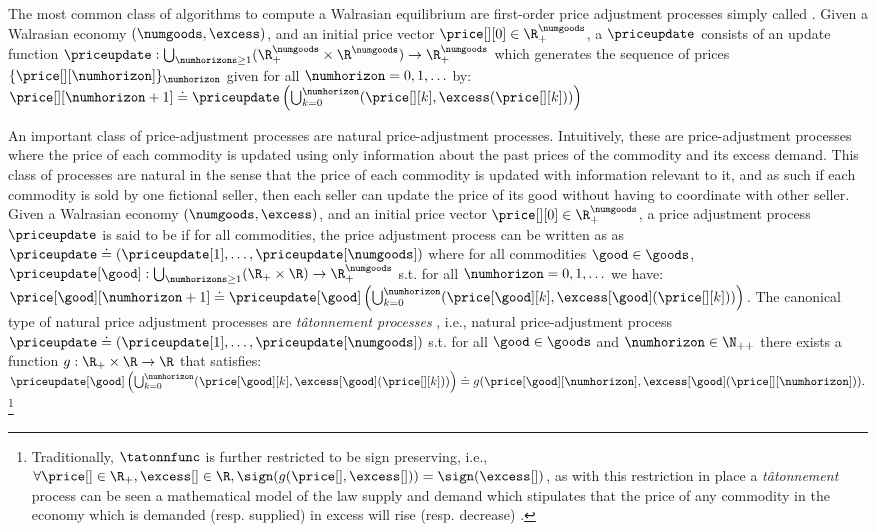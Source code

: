 The most common class of algorithms to compute a Walrasian equilibrium are first-order price adjustment processes simply called  \cite{papadimitriou2010impossibility}.
Given a Walrasian economy $(\numgoods, \excess)$, and an initial price vector $\price[][0] \in \R^\numgoods_+$, a  $\priceupdate$ consists of an update function $\priceupdate: \bigcup_{\numhorizons \geq 1} (\R^\numgoods_+ \times \R^\numgoods) \to \R^\numgoods_+$ which generates the sequence of prices $\{\price[][\numhorizon]\}_{\numhorizon}$ given for all $\numhorizon = 0, 1, \hdots$ by:
$
    \price[][\numhorizon + 1] \doteq  \priceupdate\left(\bigcup_{k = 0}^{\numhorizon} (\price[][k], \excess(\price[][k])) \right)
$

An important class of price-adjustment processes are natural price-adjustment processes. Intuitively, these are price-adjustment processes where the price of each commodity is updated using only information about the past prices of the commodity and its excess demand. This class of processes are natural in the sense that the price of each commodity is updated with information relevant to it, and as such if each commodity is sold by one fictional seller, then each seller can update the price of its good without having to coordinate with other seller.
Given a Walrasian economy $(\numgoods, \excess)$, and an initial price vector $\price[][0] \in \R^\numgoods_+$, a price adjustment process $\priceupdate$ is said to be  if for all commodities, the price adjustment process can be written as as $\priceupdate \doteq (\priceupdate[1], \hdots, \priceupdate[\numgoods])$ where for all commodities $\good \in \goods$, $\priceupdate[\good]: \bigcup_{\numhorizons \geq 1} (\R_+ \times \R) \to \R^\numgoods_+$ s.t. for all $\numhorizon = 0, 1, \hdots$ we have:
$
        \price[\good][\numhorizon + 1] \doteq  \priceupdate[\good]\left(\bigcup_{k = 0}^{\numhorizon} (\price[\good][k], \excess[\good](\price[][k])) \right)
$.
The canonical type of natural price adjustment processes are \emph{t\^atonnement processes} \cite{walras, arrow-hurwicz}, i.e., natural price-adjustment process $\priceupdate \doteq (\priceupdate[1], \hdots, \priceupdate[\numgoods])$ s.t. for all $\good \in \goods$ and $\numhorizon \in \N_{++}$ there exists a function $g: \R_+ \times \R \to \R$ that satisfies:
$\priceupdate[\good]\left(\bigcup_{k = 0}^{\numhorizon} (\price[\good][k], \excess[\good](\price[][k])) \right) \doteq g(\price[\good][\numhorizon], \excess[\good](\price[][\numhorizon])).
$%
\footnote{
Traditionally, $\tatonnfunc$ is further restricted to be sign preserving, i.e.,  $\forall \price[ ] \in \R_+, \excess[ ] \in \R, \sign(g(\price[ ], \excess[ ])) = \sign(\excess[ ])$, as with this restriction in place a \emph{t\^atonnement} process can be seen a mathematical model of the law supply and demand which stipulates that the price of any commodity in the economy which is demanded (resp. supplied) in excess will rise (resp. decrease) \citet{walras, arrow-hurwicz}. }
